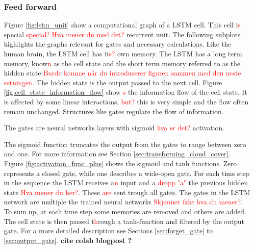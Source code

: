 \documentclass{article}
\begin{document}

\subsubsection{Feed forward} \label{sec:forward_pass_lstm}



Figure \ref{fig:lstm_unit} show a computational graph of a LSTM cell. This cell i\textcolor{red}{s} special \textcolor{red}{special? Hva mener du med det?} recurrent unit. The following subplots highlights the graphs relevant for gates and necessary calculations. Like the human brain, the LSTM cell has it\textcolor{red}{s?} own memory. The LSTM has a long term memory, know\textcolor{red}{n} as the cell state and the short term memory referred to as the hidden state \textcolor{red}{
Burde komme når du introduserer figuren sammen med den neste setningen}. The hidden state is the output passed to the next cell. Figure \ref{fig:cell_state_information_flow} show\textcolor{red}{
s} the information flow of the cell state. It is affected by some linear interactions, \textcolor{red}{but?} this is very simple and the flow often remain unchanged. Structures like gates regulate the flow of information. 




The gates are neural networks layers with sigmoid \textcolor{red}{hva er det?} activation. 

The sigmoid function truncates the output from the gates to range between zero and one. For more information see Section \ref{sec:transforming_cloud_cover}. Figure \ref{fig:activation_func_plus} shows the sigmoid and tanh functions. Zero represents a closed gate, while one describes a wide-open gate. For each time step in the sequence the LSTM receives a\textcolor{red}{n} input and a \textcolor{red}{dropp "a"} the previous hidden state \textcolor{red}{
Hva mener du her?}. These \textcolor{red}{are} sent trough all gates. The gates in the LSTM network are multiple the trained neural networks \textcolor{red}{Skjønner ikke hva du mener?}. To sum up, at each time step some memories are removed and others are added. The cell state is then passed t\textcolor{red}{h}rough a tanh-function and filtered by the output gate. For a more detailed description see Sections \ref{sec:forget_gate} to \ref{sec:output_gate}. \textbf{cite colah blogpost ?}
\end{document}
